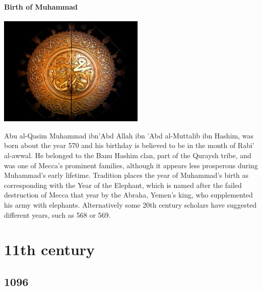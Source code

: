 \documentclass[11pt]{report}
\begin{document}
\subsection{Birth of Muhammad}
\vspace{2mm}\begin{center}\includegraphics[width=7cm]{./img/muhammad.jpg}\end{center}
Abu al-Qasim Muhammad ibn'Abd Allah ibn 'Abd al-Muttalib ibn Hashim, was born about the year 570 and his birthday is believed to be in the month of Rabi' al-awwal. He belonged to the Banu Hashim clan, part of the Quraysh tribe, and was one of Mecca's prominent families, although it appears less prosperous during Muhammad's early lifetime. Tradition places the year of Muhammad's birth as corresponding with the Year of the Elephant, which is named after the failed destruction of Mecca that year by the Abraha, Yemen's king, who supplemented his army with elephants. Alternatively some 20th century scholars have suggested different years, such as 568 or 569.

							
\part{11th century}
\chapter{1096}
\section{}
\end{document}

